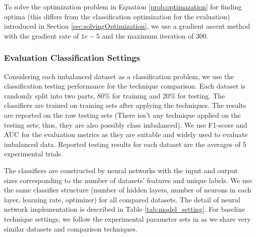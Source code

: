 To solve the optimization problem in Equation \ref{prob:optimazation} for finding optima (this differs from the classification optimization for the evaluation) introduced in Section \ref{sec:solvingOptimization}, we use a gradient ascent method with the gradient rate of $1e-5$ and the maximum iteration of 300.   

\subsubsection{Evaluation Classification Settings}
Considering each imbalanced dataset as a classification problem, we use the classification testing performance for the technique comparison. Each dataset is randomly split into two parts, 80\% for training and 20\% for testing. The classifiers are trained on training sets after applying the techniques. The results are reported on the raw testing sets (There isn't any technique applied on the testing sets; thus, they are also possibly class imbalanced). We use F1-score and AUC for the evaluation metrics as they are suitable and widely used to evaluate imbalanced data. Reported testing results for each dataset are the averages of 5 experimental trials.

The classifiers are constructed by neural networks with the input and output sizes corresponding to the number of datasets' features and unique labels. We use the same classifier structure (number of hidden layers, number of neurons in each layer, learning rate, optimizer) for all compared datasets. The detail of neural network implementation is described in Table \ref{tab:model_setting}. 
For baseline technique settings, we follow the experimental parameter sets in \cite{bib:GDO} as we share very similar datasets and comparison techniques.

